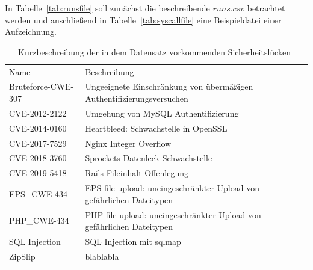             In Tabelle~\ref{tab:runsfile} soll zunächst die beschreibende $runs.csv$ betrachtet werden und anschließend in Tabelle~\ref{tab:syscallfile} eine Beispieldatei einer Aufzeichnung.

            \begin{table}[ht]\label{tab:scenarien}
                \small
                \centering
                \begin{tabular}{p{3cm}p{6.5cm}}
                    \rowcolor{Gray!36}
                    \hline
                    \multicolumn{2}{c}{Szenarien}\\
                    \hline
                    Name & Beschreibung \\
                    \rowcolor{Gray!16}
                    \hline
                    \hline
                    Bruteforce-CWE-307 & Ungeeignete Einschränkung von übermäßigen Authentifizierungsversuchen \\
                    \hline
                    CVE-2012-2122 & Umgehung von MySQL Authentifizierung\\
                    \rowcolor{Gray!16}
                    \hline
                    CVE-2014-0160 & Heartbleed: Schwachstelle in OpenSSL\\
                    \hline
                    CVE-2017-7529 & Nginx Integer Overflow \\
                    \rowcolor{Gray!16}
                    \hline
                    CVE-2018-3760 & Sprockets Datenleck Schwachstelle \\
                    \hline
                    CVE-2019-5418 & Rails Fileinhalt Offenlegung \\
                    \rowcolor{Gray!16}
                    \hline
                    EPS\_CWE-434 & EPS file upload: uneingeschränkter Upload von gefährlichen Dateitypen  \\
                    \hline
                    PHP\_CWE-434 & PHP file upload: uneingeschränkter Upload von gefährlichen Dateitypen  \\
                    \rowcolor{Gray!16}
                    \hline
                    SQL Injection & SQL Injection mit sqlmap\\
                    \hline
                    ZipSlip & blablabla \\
                    \hline
                \end{tabular}
                \caption{Kurzbeschreibung der in dem Datensatz vorkommenden Sicherheitslücken~\cite{LIDDS}}
            \end{table}

